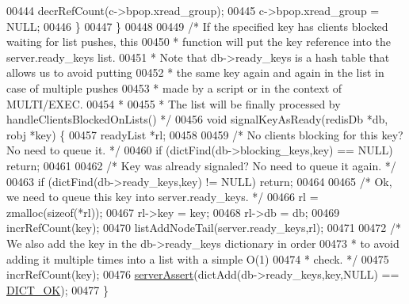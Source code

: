 \begin{DoxyCode}
00444         decrRefCount(c->bpop.xread\_group);
00445         c->bpop.xread\_group = NULL;
00446     \}
00447 \}
00448 
00449 \textcolor{comment}{/* If the specified key has clients blocked waiting for list pushes, this}
00450 \textcolor{comment}{ * function will put the key reference into the server.ready\_keys list.}
00451 \textcolor{comment}{ * Note that db->ready\_keys is a hash table that allows us to avoid putting}
00452 \textcolor{comment}{ * the same key again and again in the list in case of multiple pushes}
00453 \textcolor{comment}{ * made by a script or in the context of MULTI/EXEC.}
00454 \textcolor{comment}{ *}
00455 \textcolor{comment}{ * The list will be finally processed by handleClientsBlockedOnLists() */}
00456 \textcolor{keywordtype}{void} signalKeyAsReady(redisDb *db, robj *key) \{
00457     readyList *rl;
00458 
00459     \textcolor{comment}{/* No clients blocking for this key? No need to queue it. */}
00460     \textcolor{keywordflow}{if} (dictFind(db->blocking\_keys,key) == NULL) \textcolor{keywordflow}{return};
00461 
00462     \textcolor{comment}{/* Key was already signaled? No need to queue it again. */}
00463     \textcolor{keywordflow}{if} (dictFind(db->ready\_keys,key) != NULL) \textcolor{keywordflow}{return};
00464 
00465     \textcolor{comment}{/* Ok, we need to queue this key into server.ready\_keys. */}
00466     rl = zmalloc(\textcolor{keyword}{sizeof}(*rl));
00467     rl->key = key;
00468     rl->db = db;
00469     incrRefCount(key);
00470     listAddNodeTail(server.ready\_keys,rl);
00471 
00472     \textcolor{comment}{/* We also add the key in the db->ready\_keys dictionary in order}
00473 \textcolor{comment}{     * to avoid adding it multiple times into a list with a simple O(1)}
00474 \textcolor{comment}{     * check. */}
00475     incrRefCount(key);
00476     \hyperlink{server_8h_a88114b5169b4c382df6b56506285e56a}{serverAssert}(dictAdd(db->ready\_keys,key,NULL) == \hyperlink{dict_8h_a2afecbeab8f7efbc183048f52f6d17e5}{DICT\_OK});
00477 \}
\end{DoxyCode}
